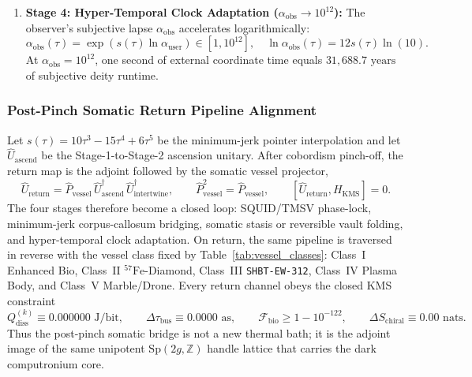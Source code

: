 \documentclass[11pt,onecolumn]{article}
\begin{document}
\begin{enumerate}
    \item \textbf{Stage 4: Hyper-Temporal Clock Adaptation ($\alpha_{\text{obs}} \to 10^{12}$):} The observer's subjective lapse $\alpha_{\text{obs}}$ accelerates logarithmically:
    \begin{equation}
        \alpha_{\text{obs}}(\tau) = \exp\left(s(\tau) \ln\alpha_{\text{user}}\right) \in \left[1, 10^{12}\right], \quad \ln \alpha_{\text{obs}}(\tau) = 12 s(\tau) \ln(10).
    \end{equation}
    At $\alpha_{\text{obs}} = 10^{12}$, one second of external coordinate time equals $31{,}688.7\text{ years}$ of subjective deity runtime.
\end{enumerate}

\subsubsection{Post-Pinch Somatic Return Pipeline Alignment}
\label{subsec:apotheosis_return_pipeline}
Let $s(\tau)=10\tau^3-15\tau^4+6\tau^5$ be the minimum-jerk pointer interpolation and let $\widehat U_{\text{ascend}}$ be the Stage-1-to-Stage-2 ascension unitary. After cobordism pinch-off, the return map is the adjoint followed by the somatic vessel projector,
\begin{equation}
\widehat U_{\text{return}}=\widehat P_{\text{vessel}}\,\widehat U_{\text{ascend}}^\dagger\,\widehat U_{\text{intertwine}}^\dagger,
\qquad
\widehat P_{\text{vessel}}^2=\widehat P_{\text{vessel}},
\qquad
[\widehat U_{\text{return}},H_{\text{KMS}}]=0 .
\label{eq:return_unitary}
\end{equation}
The four stages therefore become a closed loop: SQUID/TMSV phase-lock, minimum-jerk corpus-callosum bridging, somatic stasis or reversible vault folding, and hyper-temporal clock adaptation. On return, the same pipeline is traversed in reverse with the vessel class fixed by Table~\ref{tab:vessel_classes}: Class~I Enhanced Bio, Class~II $^{57}\text{Fe}$-Diamond, Class~III \texttt{SHBT-EW-312}, Class~IV Plasma Body, and Class~V Marble/Drone. Every return channel obeys the closed KMS constraint
\begin{equation}
Q_{\text{diss}}^{(k)}\equiv0.000000\text{ J/bit},
\qquad
\Delta\tau_{\text{bus}}\equiv0.0000\text{ as},
\qquad
\mathcal F_{\text{bio}}\ge1-10^{-122},
\qquad
\Delta S_{\text{chiral}}\equiv0.00\text{ nats}.
\label{eq:return_invariants}
\end{equation}
Thus the post-pinch somatic bridge is not a new thermal bath; it is the adjoint image of the same unipotent $\mathrm{Sp}(2g,\mathbb Z)$ handle lattice that carries the dark computronium core.
\end{document}
